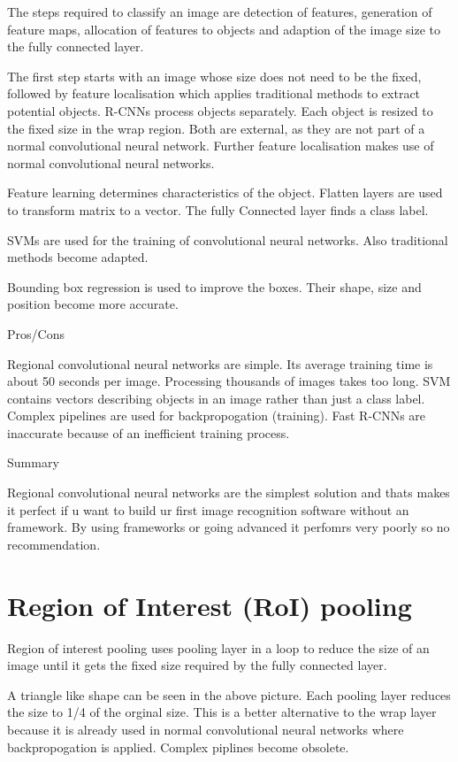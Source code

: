 \documentclass[a4paper,13pt,twoside]{book}
\begin{document}
The steps required to classify an image are detection of features, generation of feature maps, allocation of features to objects and adaption of the image size to the fully connected layer.

The first step starts with an image whose size does not need to be the fixed, followed by feature localisation which applies traditional methods to extract potential objects. R-CNNs process objects separately. Each object is resized to the fixed size in the wrap region. Both are external, as they are not part of a normal convolutional neural network. Further feature localisation makes use of normal convolutional neural networks.

Feature learning determines characteristics of the object. Flatten layers are used to transform matrix to a vector. The fully Connected layer finds a class label.

SVMs are used for the training of convolutional neural networks. Also traditional methods become adapted.

Bounding box regression is used to improve the boxes. Their shape, size and position become more accurate.

Pros/Cons

Regional convolutional neural networks are simple. Its average training time is about 50 seconds per image. Processing thousands of images takes too long. SVM contains vectors describing objects in an image rather than just a class label. Complex pipelines are used for backpropogation (training).
Fast R-CNNs are inaccurate because of an inefficient training process.

Summary

Regional convolutional neural networks are the simplest solution and thats makes it perfect if u want to build ur first image recognition software without an framework. By using frameworks or going advanced it perfomrs very poorly so no recommendation.

\section{Region of Interest (RoI) pooling}

Region of interest pooling uses pooling layer in a loop to reduce the size of an image until it gets the fixed size required by the fully connected layer.

A triangle like shape can be seen in the above picture. Each pooling layer reduces the size to 1/4 of the orginal size.
This is a better alternative to the wrap layer because it is already used in normal convolutional neural networks where backpropogation is applied. Complex piplines become obsolete.
\end{document}
